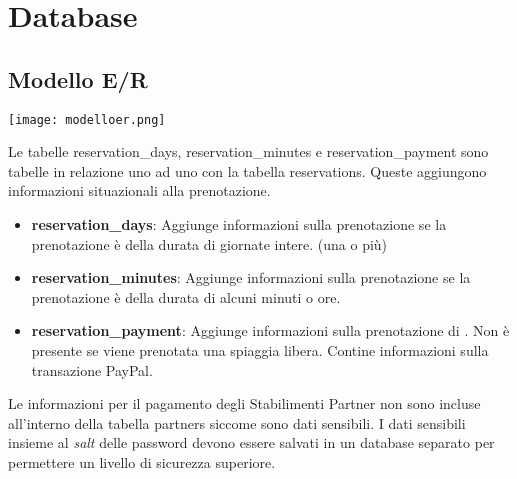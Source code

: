 \section{Database}

\subsection{Modello E/R}%
\label{sec:modello_e_r}

\texttt{[image: modelloer.png]}

Le tabelle reservation\_days, reservation\_minutes e reservation\_payment sono tabelle in relazione uno ad uno con la tabella reservations. Queste aggiungono informazioni situazionali alla prenotazione.

\begin{itemize}
    \item \textbf{reservation\_days}: Aggiunge informazioni sulla prenotazione se la prenotazione \`e della durata di giornate intere. (una o pi\`u)
    \item \textbf{reservation\_minutes}: Aggiunge informazioni sulla prenotazione se la prenotazione \`e della durata di alcuni minuti o ore.
    \item \textbf{reservation\_payment}: Aggiunge informazioni sulla prenotazione di . Non \`e presente se viene prenotata una spiaggia libera. Contine informazioni sulla transazione PayPal.
\end{itemize}

Le informazioni per il pagamento degli Stabilimenti Partner non sono incluse all'interno della tabella partners siccome sono dati sensibili. I dati sensibili insieme al \emph{salt} delle password devono essere salvati in un database separato per permettere un livello di sicurezza superiore.